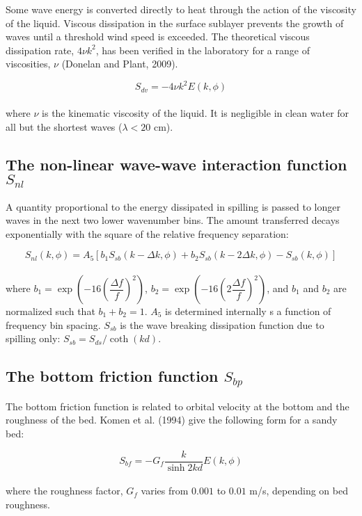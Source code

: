 \documentclass[letterpaper]{article}
\numberwithin{equation}{section}
\begin{document}
Some wave energy is converted directly to heat 
through the action of the viscosity of the liquid.
Viscous dissipation in the surface sublayer prevents 
the growth of waves until a threshold wind speed is exceeded.
The theoretical viscous dissipation rate, $4\nu k^{2}$, 
has been verified in the laboratory for a range of viscosities, 
$\nu$ (Donelan and Plant, 2009).

\begin{equation}
S_{dv}= -4\nu k^{2}E(k,\phi)
\label{sdv} 
\end{equation}
\\

where $\nu$ is the kinematic viscosity of the liquid. 
It is negligible in clean water for all but the shortest waves ($\lambda<20$ cm).

\subsection{The non-linear wave-wave interaction function $S_{nl}$}

A quantity proportional to the energy dissipated in spilling is passed to longer waves in the next two lower wavenumber bins. 
The amount transferred decays exponentially with the square of the relative frequency separation:

\begin{equation}
S_{nl}(k,\phi) = A_{5}\left[b_{1}S_{sb}(k-\Delta k,\phi)
                           +b_{2}S_{sb}(k-2\Delta k,\phi)
                           -S_{sb}(k,\phi)\right]
\label{snl}
\end{equation}
\\
where $b_{1}=\exp(-16(\dfrac{\Delta{f}}{f})^{2})$, $b_{2}=\exp(-16(2\dfrac{\Delta{f}}{f})^{2})$,
and $b_{1}$ and $b_{2}$ are normalized such that $b_{1}+b_{2}=1$.
$A_5$ is determined internally s a function of frequency bin spacing.
$S_{sb}$ is the wave breaking dissipation function due to spilling only: $S_{sb} = S_{ds} / \coth(kd)$.

\subsection{The bottom friction function $S_{bp}$}

The bottom friction function is related to orbital velocity at the bottom and the roughness of the bed. 
Komen et al. (1994) give the following form for a sandy bed:

\begin{equation}
S_{bf}= -G_{f}\dfrac{k}{\sinh 2kd} E(k,\phi)
\label{sbf} 
\end{equation}
\\
where the roughness factor, $G_{f}$ varies from $0.001$ to $0.01$ m/s, depending on bed roughness.
\end{document}
